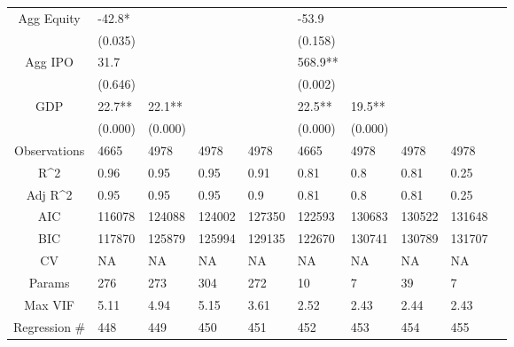 \documentclass{article}
\begin{document}
\begin{table}[H]
\begin{tabular}{|clllllllll|}
  Agg Equity & -42.8* &  &  &  & -53.9 &  &  &  & \\ 
   & (0.035) &  &  &  & (0.158) &  &  &  & \\ 
  Agg IPO & 31.7 &  &  &  & 568.9** &  &  &  & \\ 
   & (0.646) &  &  &  & (0.002) &  &  &  & \\ 
  GDP & 22.7** & 22.1** &  &  & 22.5** & 19.5** &  &  & \\ 
   & (0.000) & (0.000) &  &  & (0.000) & (0.000) &  &  & \\ 
  \hline 
 Observations & 4665 & 4978 & 4978 & 4978 & 4665 & 4978 & 4978 & 4978 & \\ 
  R^2 & 0.96 & 0.95 & 0.95 & 0.91 & 0.81 & 0.8 & 0.81 & 0.25 & \\ 
  Adj R^2 & 0.95 & 0.95 & 0.95 & 0.9 & 0.81 & 0.8 & 0.81 & 0.25 & \\ 
  AIC & 116078 & 124088 & 124002 & 127350 & 122593 & 130683 & 130522 & 131648 & \\ 
  BIC & 117870 & 125879 & 125994 & 129135 & 122670 & 130741 & 130789 & 131707 & \\ 
  CV & NA & NA & NA & NA & NA & NA & NA & NA & \\ 
  Params & 276 & 273 & 304 & 272 & 10 & 7 & 39 & 7 & \\ 
  Max VIF & 5.11 & 4.94 & 5.15 & 3.61 & 2.52 & 2.43 & 2.44 & 2.43 & \\ 
  Regression \# & 448 & 449 & 450 & 451 & 452 & 453 & 454 & 455 & \\ 
   \hline
\end{tabular}
 
\end{table}
\end{document}
